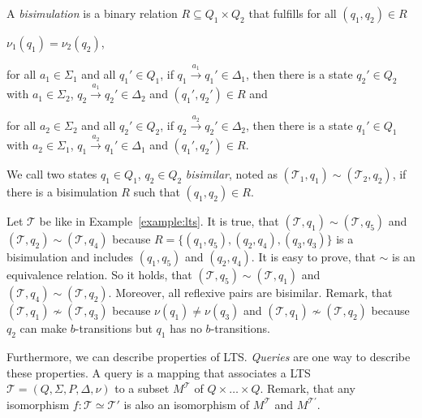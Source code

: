 \begin{definition}
    A \emph{bisimulation} is a binary relation $R \subseteq Q_1 \times Q_2$ that fulfills for all $(q_1, q_2) \in R$
    \begin{compactitem}
        \item $\nu_1 (q_1) = \nu_2 (q_2)$,
        \item for all $a_1 \in \Sigma_1$ and all $q_1' \in Q_1$, if $q_1 \overset{a_1}{\rightarrow} q_1' \in
        \Delta_1$, then there is a state $q_2' \in Q_2$ with $a_1 \in \Sigma_2$, $q_2
        \overset{a_1}{\rightarrow} q_2' \in \Delta_2$ and $(q_1', q_2') \in R$ and
        \item for all $a_2 \in \Sigma_2$ and all $q_2' \in Q_2$, if $q_2 \overset{a_2}{\rightarrow} q_2' \in
        \Delta_2$, then there is a state $q_1' \in Q_1$ with $a_2 \in \Sigma_1$, $q_1
        \overset{a_2}{\rightarrow} q_1' \in \Delta_1$ and $(q_1', q_2') \in R$.
    \end{compactitem}
    We call two states $q_1 \in Q_1$, $q_2 \in Q_2$ \emph{bisimilar}, noted as $(\mathcal{T}_1, q_1) \sim
    (\mathcal{T}_2, q_2)$, if there
    is a bisimulation $R$ such that $(q_1, q_2) \in R$.
\end{definition}

\begin{example}
    \label{example:bisimilar}
    Let $\mathcal{T}$ be like in Example~\ref{example:lts}. It is true, that $(\mathcal{T}, q_1) \sim
    (\mathcal{T}, q_5)$ and $(\mathcal{T}, q_2) \sim (\mathcal{T}, q_4)$ because $R = \{(q_1, q_5), (q_2, q_4), (q_3,
    q_3)\}$ is a bisimulation and includes $(q_1, q_5)$ and $(q_2, q_4)$. It is easy to prove, that $\sim$ is an
    equivalence relation. So it holds, that $(\mathcal{T}, q_5) \sim (\mathcal{T}, q_1)$ and $(\mathcal{T}, q_4) \sim
    (\mathcal{T}, q_2)$. Moreover, all reflexive pairs are bisimilar. Remark, that $(\mathcal{T}, q_1) \not\sim
    (\mathcal{T}, q_3)$ because $\nu(q_1) \neq \nu(q_3)$ and $(\mathcal{T}, q_1) \not\sim (\mathcal{T}, q_2)$ because
    $q_2$ can make $b$-transitions but $q_1$ has no $b$-transitions.
\end{example}

Furthermore, we can describe properties of LTS. \textit{Queries} are one way to describe these properties. A query
is a mapping that associates a LTS $\mathcal{T} = (Q, \Sigma, P, \Delta, \nu)$ to a subset
$M^{\mathcal{T}}$ of $Q \times \dots \times Q$. Remark, that any isomorphism $f: \mathcal{T} \simeq
\mathcal{T}'$ is also an isomorphism of $M^{\mathcal{T}}$ and $M^{{\mathcal{T}}'}$.

